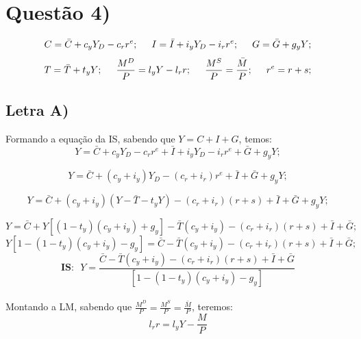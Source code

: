 \documentclass{article}
\begin{document}
\clearpage
\section*{Questão 4)}
$$C = \bar{C}+c_y Y_D - c_r r^{e}; \hspace{0.5cm} 
I = \bar{I}+i_y Y_D - i_r r^{e}; \hspace{0.5cm}
G = \bar{G}+g_y Y;$$
$$T = \bar{T}+t_y Y; \hspace{0.5cm} 
\frac{M^D}{P} = l_y Y - l_r r; \hspace{0.5cm} 
\frac{M^S}{P}=\frac{\bar{M}}{P}; \hspace{0.5cm} 
r^e=r+s;$$

\subsection*{Letra A)}
Formando a equação da IS, sabendo que $Y=C+I+G$, temos:
\begin{equation}
Y=\bar{C}+c_y Y_D - c_r r^{e} + \bar{I}+i_y Y_D - i_r r^{e} + \bar{G}+g_y Y;
\end{equation}

\begin{equation}
Y=\bar{C}+(c_y+i_y)Y_D - (c_r+i_r)r^{e} + \bar{I} + \bar{G}+g_y Y;
\end{equation}

\begin{equation}
Y=\bar{C}+(c_y+i_y)(Y-\bar{T}-t_yY) - (c_r+i_r)(r+s) + \bar{I} + \bar{G}+g_y Y;
\end{equation}

\begin{equation}\label{eq:4AY}
Y=\bar{C}+Y\left[(1-t_y)(c_y+i_y)+g_y\right]-\bar{T}(c_y+i_y) - (c_r+i_r)(r+s) +\bar{I} +\bar{G};
\end{equation}
\begin{equation}
Y\left[1 -(1-t_y)(c_y+i_y)-g_y\right]=\bar{C}-\bar{T}(c_y+i_y) - (c_r+i_r)(r+s) +\bar{I} +\bar{G};
\end{equation}
\begin{equation}
\textbf{IS:} \>\>\> Y=\frac{\bar{C}-\bar{T}(c_y+i_y) - (c_r+i_r)(r+s) +\bar{I} +\bar{G}}{\left[1 -(1-t_y)(c_y+i_y)-g_y\right]}
\end{equation}
\\
Montando a LM, sabendo que $\frac{M^D}{P}=\frac{M^S}{P}=\frac{\bar{M}}{P}$, teremos:
\begin{equation}
l_r r = l_yY - \frac{M}{P}    
\end{equation}
\end{document}
